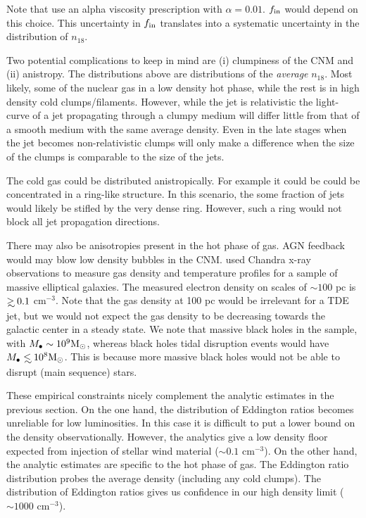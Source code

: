 \documentclass[usenatbib,fleqn]{mnras}
\newcommand\lsim{\mathrel{\rlap{\lower4pt\hbox{\hskip1pt$\sim$}}
    \raise1pt\hbox{$<$}}}
\newcommand\gsim{\mathrel{\rlap{\lower4pt\hbox{\hskip1pt$\sim$}}
    \raise1pt\hbox{$>$}}}
\newcommand{\Mbh}[1][]{M_{\bullet#1}}
\newcommand{\Msun}{{\rm M_\odot}}
\begin{document}
Note that \citet{Li+2013} use an alpha viscosity prescription with
$\alpha=0.01$.  $f_{\rm in}$ would depend on this choice. This
uncertainty in $f_{\rm in}$ translates into a systematic uncertainty
in the distribution of $n_{18}$. 
 
Two potential complications to keep in mind are (i) clumpiness of the
CNM and (ii) anistropy. The distributions above are distributions of
the {\it average} $n_{18}$.  Most likely, some of the nuclear gas in a
low density hot phase, while the rest is in high density cold
clumps/filaments.  However, while the jet is relativistic the
light-curve of a jet propagating through a clumpy medium will differ
little from that of a smooth medium with the same average
density. Even in the late stages when the jet becomes non-relativistic
clumps will only make a difference when the size of the clumps is
comparable to the size of the jets.

The cold gas could be distributed anistropically. For example it could
be could be concentrated in a ring-like structure. In this scenario,
the some fraction of jets would likely be stifled by the very dense
ring. However, such a ring would not block all jet propagation
directions. 

There may also be anisotropies present in the hot phase of gas. AGN
feedback would may blow low density bubbles in the
CNM. \citet{Russell+2013} used Chandra x-ray observations to measure
gas density and temperature profiles for a sample of massive
elliptical galaxies. The measured electron density on scales of $\sim
100$ pc is $\gsim 0.1$ cm$^{-3}$. Note that the gas density at 100 pc
would be irrelevant for a TDE jet, but we would not expect the gas
density to be decreasing towards the galactic center in a steady
state.  We note that massive black holes in the \citet{Russell+2013}
sample, with $\Mbh\sim 10^{9} \Msun$, whereas black holes tidal
disruption events would have $\Mbh\lsim 10^8 \Msun$. This is because
more massive black holes would not be able to disrupt (main sequence)
stars.


These empirical constraints nicely complement the analytic estimates
in the previous section. On the one hand, the distribution of
Eddington ratios becomes unreliable for low luminosities.  In this
case it is difficult to put a lower bound on the density
observationally. However, the analytics give a low density floor
expected from injection of stellar wind material ($\sim 0.1$
cm$^{-3}$). On the other hand, the analytic estimates are specific to
the hot phase of gas. The Eddington ratio distribution probes the
average density (including any cold clumps). The
distribution of Eddington ratios gives us confidence in our high
density limit ($\sim 1000$ cm$^{-3}$).
\end{document}
